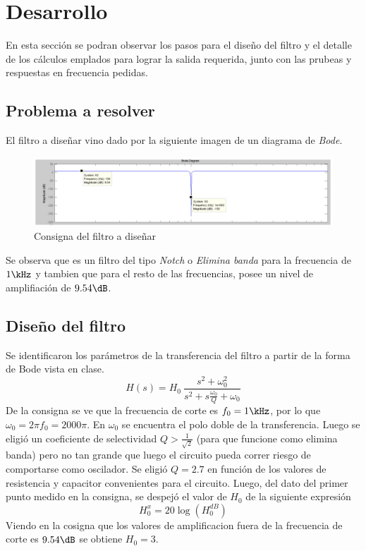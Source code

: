 \section*{Desarrollo}
En esta secci\'on se podran observar los pasos para el diseño del filtro y el detalle de los c\'alculos emplados para lograr la salida requerida, junto con las prubeas y respuestas en frecuencia pedidas.\\

\subsection*{Problema a resolver}
El filtro a diseñar vino dado por la siguiente imagen de un diagrama de \textit{Bode}. \\
\begin{figure}[H]
	\centering
	\includegraphics[width=15cm]{imagenes/consigna}
	\caption{Consigna del filtro a diseñar}
	\label{img:consigna}
\end{figure}

Se observa que es un filtro del tipo \textit{Notch} o \textit{Elimina banda} para la frecuencia de $1\kHz$ y tambien que para el resto de las frecuencias, posee un nivel de amplifiaci\'on de $9.54\dB$.

\subsection*{Diseño del filtro}
Se identificaron los par\'ametros de la transferencia del filtro a partir de la forma de Bode vista en clase.\\

\begin{equation}
  H(s)=H_0\ \frac{s^2 + \omega_0 ^2}{s^2 +s \frac{\omega_0}{Q} +\omega_0}
\end{equation}
De la  consigna se ve que la frecuencia de corte es $f_0 = 1\kHz$, por lo que $\omega_0 = 2\pi f_0= 2000\pi$. En $\omega_0$ se encuentra el polo doble de la transferencia.
Luego se eligi\'o un coeficiente de selectividad $Q > \frac{1}{\sqrt 2}$ (para que funcione como elimina banda) pero no tan grande que luego el circuito pueda correr riesgo de comportarse como oscilador. Se eligi\'o $Q= 2.7$ en funci\'on de los valores de resistencia y capacitor convenientes para el circuito.
Luego, del dato del primer punto medido en la consigna, se despej\'o el valor de $H_0$ de la siguiente expresi\'on
\begin{equation}
  H_0^x = 20 \log (H_0^{dB})
\end{equation}
Viendo en la cosigna que los valores de amplificacion fuera de la frecuencia de corte es $9.54 \dB$ se obtiene $H_0 = 3 $.
